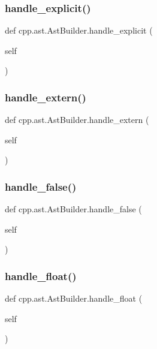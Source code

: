 \subsubsection{\texorpdfstring{handle\_explicit()}{handle\_explicit()}}
{\footnotesize\ttfamily def cpp.\+ast.\+Ast\+Builder.\+handle\+\_\+explicit (\begin{DoxyParamCaption}\item[{}]{self }\end{DoxyParamCaption})}

\mbox{\label{classcpp_1_1ast_1_1_ast_builder_a49039750d971240a270606f0608c1ff0}} 
\subsubsection{\texorpdfstring{handle\_extern()}{handle\_extern()}}
{\footnotesize\ttfamily def cpp.\+ast.\+Ast\+Builder.\+handle\+\_\+extern (\begin{DoxyParamCaption}\item[{}]{self }\end{DoxyParamCaption})}

\mbox{\label{classcpp_1_1ast_1_1_ast_builder_afe125e384026baf74b55593b254fc10c}} 
\subsubsection{\texorpdfstring{handle\_false()}{handle\_false()}}
{\footnotesize\ttfamily def cpp.\+ast.\+Ast\+Builder.\+handle\+\_\+false (\begin{DoxyParamCaption}\item[{}]{self }\end{DoxyParamCaption})}

\mbox{\label{classcpp_1_1ast_1_1_ast_builder_aabe3f6d67124181a8cd2665a4562d4f6}} 
\subsubsection{\texorpdfstring{handle\_float()}{handle\_float()}}
{\footnotesize\ttfamily def cpp.\+ast.\+Ast\+Builder.\+handle\+\_\+float (\begin{DoxyParamCaption}\item[{}]{self }\end{DoxyParamCaption})}

